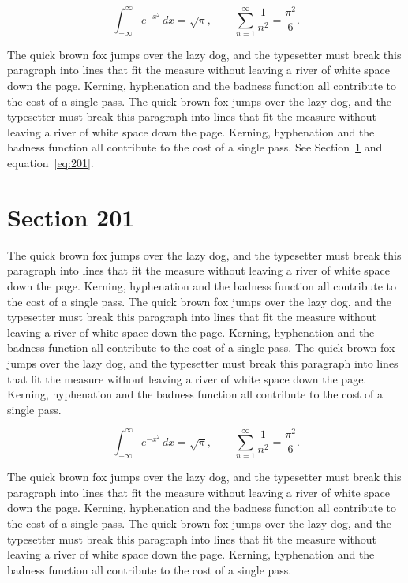 \documentclass{article}
\begin{document}
\begin{equation}\label{eq:200}
\int_{-\infty}^{\infty} e^{-x^{2}}\,dx = \sqrt{\pi}, \qquad
\sum_{n=1}^{\infty} \frac{1}{n^{2}} = \frac{\pi^{2}}{6}.
\end{equation}

The quick brown fox jumps over the lazy dog, and the typesetter must break this paragraph into lines that fit the measure without leaving a river of white space down the page. Kerning, hyphenation and the badness function all contribute to the cost of a single pass. The quick brown fox jumps over the lazy dog, and the typesetter must break this paragraph into lines that fit the measure without leaving a river of white space down the page. Kerning, hyphenation and the badness function all contribute to the cost of a single pass. 
See Section~\ref{sec:201} and equation~\eqref{eq:201}.
\section{Section 201}
\label{sec:201}
The quick brown fox jumps over the lazy dog, and the typesetter must break this paragraph into lines that fit the measure without leaving a river of white space down the page. Kerning, hyphenation and the badness function all contribute to the cost of a single pass. The quick brown fox jumps over the lazy dog, and the typesetter must break this paragraph into lines that fit the measure without leaving a river of white space down the page. Kerning, hyphenation and the badness function all contribute to the cost of a single pass. The quick brown fox jumps over the lazy dog, and the typesetter must break this paragraph into lines that fit the measure without leaving a river of white space down the page. Kerning, hyphenation and the badness function all contribute to the cost of a single pass. 

\begin{equation}\label{eq:201}
\int_{-\infty}^{\infty} e^{-x^{2}}\,dx = \sqrt{\pi}, \qquad
\sum_{n=1}^{\infty} \frac{1}{n^{2}} = \frac{\pi^{2}}{6}.
\end{equation}

The quick brown fox jumps over the lazy dog, and the typesetter must break this paragraph into lines that fit the measure without leaving a river of white space down the page. Kerning, hyphenation and the badness function all contribute to the cost of a single pass. The quick brown fox jumps over the lazy dog, and the typesetter must break this paragraph into lines that fit the measure without leaving a river of white space down the page. Kerning, hyphenation and the badness function all contribute to the cost of a single pass. 
\end{document}
